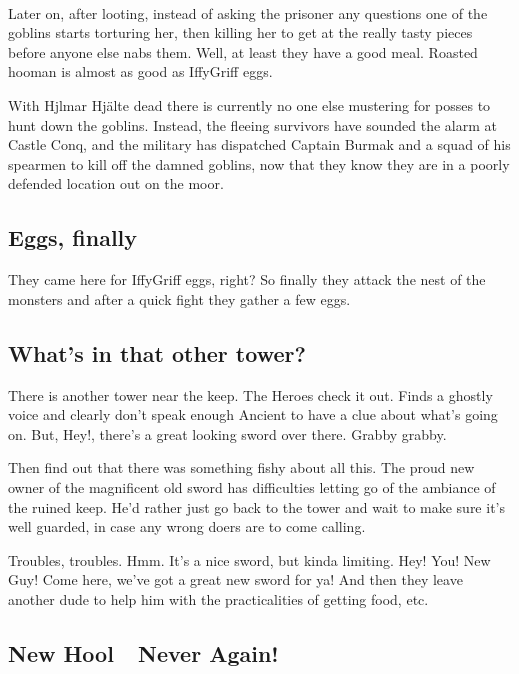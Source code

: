 \

Later on, after looting, instead of asking the prisoner any questions one of the goblins starts torturing her, then killing her to get at the really tasty pieces before anyone else nabs them. Well, at least they have a good meal. Roasted hooman is almost as good as IffyGriff eggs.

\begin{readoutloud}
With Hjlmar Hjälte dead there is currently no one else mustering for posses to hunt down the goblins. Instead, the fleeing survivors have sounded the alarm at Castle Conq, and the military has dispatched Captain Burmak and a squad of his spearmen to kill off the damned goblins, now that they know they are in a poorly defended location out on the moor.
\end{readoutloud}


\subsection*{Eggs, finally}

They came here for IffyGriff eggs, right? So finally they attack the nest of the monsters and after a quick fight they gather a few eggs.


\subsection*{What's in that other tower?}

There is another tower near the keep. The Heroes check it out. Finds a ghostly voice and clearly don't speak enough Ancient to have a clue about what's going on. But, Hey!, there's a great looking sword over there. Grabby grabby.

Then find out that there was something fishy about all this. The proud new owner of the magnificent old sword has difficulties letting go of the ambiance of the ruined keep. He'd rather just go back to the tower and wait to make sure it's well guarded, in case any wrong doers are to come calling.

Troubles, troubles. Hmm. It's a nice sword, but kinda limiting. Hey! You! New Guy! Come here, we've got a great new sword for ya! And then they leave another dude to help him with the practicalities of getting food, etc.


\subsection*{New Hool~\mdash~Never Again!}

